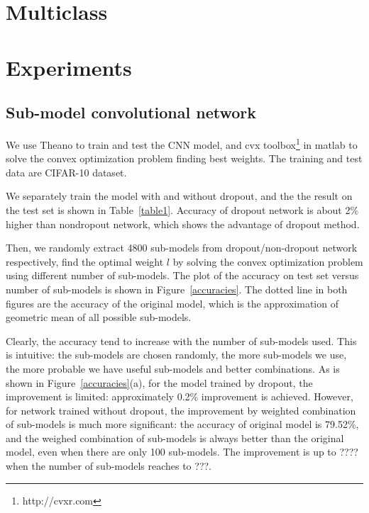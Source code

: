 \documentclass{article} %
\begin{document}
\section{Multiclass}


\section{Experiments}
\subsection{Sub-model convolutional network}
We use Theano\cite{theano} to train and test the CNN model, and cvx toolbox\footnote{http://cvxr.com} in matlab to solve the convex optimization problem finding best weights. The training and test data are CIFAR-10 dataset.
\par
We separately train the model with and without dropout, and the the result on the test set is shown in Table~\ref{table1}. Accuracy of dropout network is about 2\% higher than nondropout network, which shows the advantage of dropout method.
\par
Then, we randomly extract 4800 sub-models from dropout/non-dropout network respectively, find the optimal weight $l$ by solving the convex optimization problem using different number of sub-models. The plot of the accuracy on test set versus number of sub-models is shown in Figure~\ref{accuracies}. The dotted line in both figures are the accuracy of the original model, which is the approximation of geometric mean of all possible sub-models.
\par 
Clearly, the accuracy tend to increase with the number of sub-models used. This is intuitive: the sub-models are chosen randomly, the more sub-models we use, the more probable we have useful sub-models and better combinations. As is shown in Figure~\ref{accuracies}(a), for the model trained by dropout, the improvement is limited: approximately 0.2\% improvement is achieved. However, for network trained without dropout, the improvement by weighted combination of sub-models is much more significant: the accuracy of original model is 79.52\%, and the weighed combination of sub-models is always better than the original model, even when there are only 100 sub-models. The improvement is up to ???? when the number of sub-models reaches to ???.
\par
\end{document}
